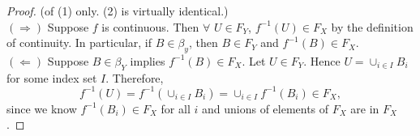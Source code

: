 \begin{proof}
	(of (1) only. (2) is virtually identical.)\\
	$(\Rightarrow)$ Suppose $f$ is continuous. Then $\forall$ $U \in F_Y$, $f^{-1}(U) \in F_X$ by the definition of continuity. In particular, if $B \in \beta_y$, then $B \in F_Y$ and $f^{-1}(B) \in F_X$. \\
	$(\Leftarrow)$ Suppose $B \in \beta_Y$ implies $f^{-1}(B) \in F_X$. Let $U \in F_Y$. Hence $U = \cup_{i \in I} B_i$ for some index set $I$. Therefore, $$f^{-1}(U) = f^{-1}(\cup_{i \in I} B_i) = \cup_{i \in I} f^{-1}(B_i) \in F_X,$$ since we know $f^{-1}(B_i) \in F_X$ for all $i$ and unions of elements of $F_X$ are in $F_X$. 
\end{proof}
